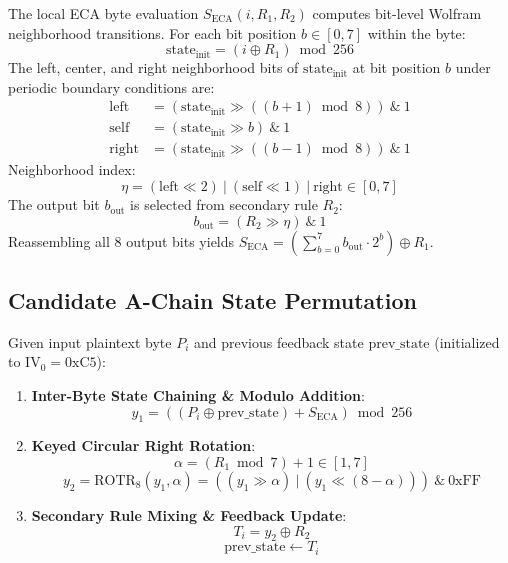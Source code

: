 The local ECA byte evaluation $S_{\text{ECA}}(i, R_1, R_2)$ computes bit-level Wolfram neighborhood transitions. For each bit position $b \in [0, 7]$ within the byte:
\begin{equation}
\text{state}_{\text{init}} = (i \oplus R_1) \bmod 256
\end{equation}
The left, center, and right neighborhood bits of $\text{state}_{\text{init}}$ at bit position $b$ under periodic boundary conditions are:
\begin{align}
\text{left} &= (\text{state}_{\text{init}} \gg ((b+1) \bmod 8)) \ \& \ 1 \\
\text{self} &= (\text{state}_{\text{init}} \gg b) \ \& \ 1 \\
\text{right} &= (\text{state}_{\text{init}} \gg ((b-1) \bmod 8)) \ \& \ 1
\end{align}
Neighborhood index:
\begin{equation}
\eta = (\text{left} \ll 2) \ |\  (\text{self} \ll 1) \ |\  \text{right} \in [0, 7]
\end{equation}
The output bit $b_{\text{out}}$ is selected from secondary rule $R_2$:
\begin{equation}
b_{\text{out}} = (R_2 \gg \eta) \ \& \ 1
\end{equation}
Reassembling all 8 output bits yields $S_{\text{ECA}} = \left( \sum_{b=0}^7 b_{\text{out}} \cdot 2^b \right) \oplus R_1$.

\subsection{Candidate A-Chain State Permutation}
\label{subsec:candidate_a_chain}
Given input plaintext byte $P_i$ and previous feedback state $\text{prev\_state}$ (initialized to $\text{IV}_0 = \text{0xC5}$):

\begin{enumerate}
    \item \textbf{Inter-Byte State Chaining & Modulo Addition}:
    \begin{equation}
    y_1 = ((P_i \oplus \text{prev\_state}) + S_{\text{ECA}}) \bmod 256
    \label{eq:chain_mod}
    \end{equation}
    
    \item \textbf{Keyed Circular Right Rotation}:
    \begin{equation}
    \alpha = (R_1 \bmod 7) + 1 \in [1, 7]
    \end{equation}
    \begin{equation}
    y_2 = \text{ROTR}_8(y_1, \alpha) = ((y_1 \gg \alpha) \ |\  (y_1 \ll (8 - \alpha))) \ \& \ \text{0xFF}
    \label{eq:keyed_rotr}
    \end{equation}
    
    \item \textbf{Secondary Rule Mixing & Feedback Update}:
    \begin{equation}
    T_i = y_2 \oplus R_2
    \label{eq:sec_rule_mix}
    \end{equation}
    \begin{equation}
    \text{prev\_state} \leftarrow T_i
    \end{equation}
\end{enumerate}

